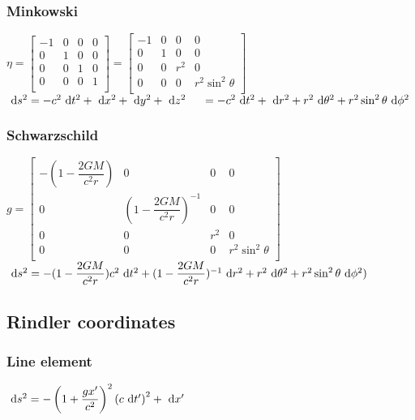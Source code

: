 \subsubsection{Minkowski}
\begin{itemize}
\itemt \( \eta =
\begin{bmatrix}
-1 	&0	&0	&0 	\\
0 	&1	&0	&0	\\
0 	&0	&1	&0	\\
0 	&0	&0	&1	\\
\end{bmatrix} =
\begin{bmatrix}
-1 	&0	&0	&0 	\\
0 	&1	&0	&0	\\
0 	&0	&r^2	&0	\\
0 	&0	&0	&r^2 \sin^2 \theta	\\
\end{bmatrix}\)
\itemt \( \dn s^2 = -c^2 \dn t^2 + \dn x^2 + \dn y^2 + \dn z^2 \tab[0.5cm]=  -c^2 \dn t^2 + \dn r^2 + r^2 \dn \theta ^2 + r^2 \sin^2 \theta \dn \phi^2 \)
\end{itemize}

\subsubsection{Schwarzschild}
\begin{itemize}
\itemt \( g =
\begin{bmatrix}
-(1-\dfrac{2GM}{c^2r}) 	&0							&0		&0 					\\
0 						&(1-\dfrac{2GM}{c^2r})^{-1}	&0		&0					\\
0 						&0							&r^2	&0					\\
0 						&0							&0		&r^2\sin^2\theta	\\
\end{bmatrix} \)
\itemt \( \dn s^2 = -(1-\dfrac{2GM}{c^2r})c^2 \dn t^2 + (1-\dfrac{2GM}{c^2r})^{-1} \dn r^2 + r^2 \dn \theta^2 + r^2\sin^2 \theta \dn \phi^2) \)
\end{itemize}

		\subsection{Rindler coordinates}

\subsubsection{Line element}
\begin{itemize}
\itemt \( \dn s^2 = -\left(1+\dfrac{gx'}{c^2}\right)^2\left(c \dn t'\right)^2 + \dn x' \)
\end{itemize}

